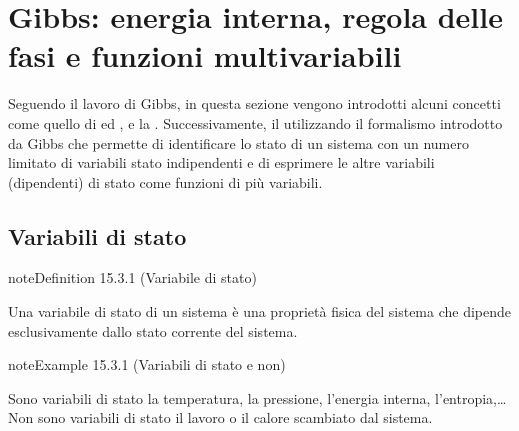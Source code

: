 \documentclass[letterpaper,10pt,italian]{jupyterBook}
\begin{document}
\section{Gibbs: energia interna, regola delle fasi e funzioni multi\sphinxhyphen{}variabili}
\label{\detokenize{ch/thermodynamics/principles-gibbs-phase-rule:gibbs-energia-interna-regola-delle-fasi-e-funzioni-multi-variabili}}\label{\detokenize{ch/thermodynamics/principles-gibbs-phase-rule:physics-hs-thermodynamics-foundation-principles-gibbs-phase-rule}}\label{\detokenize{ch/thermodynamics/principles-gibbs-phase-rule::doc}}
\sphinxAtStartPar
Seguendo il lavoro di Gibbs, in questa sezione vengono introdotti alcuni concetti come quello di {\hyperref[\detokenize{ch/thermodynamics/principles-gibbs-phase-rule:physics-hs-thermodynamics-foundation-principles-gibbs-phase-rule-state-vars}]{}} ed {\hyperref[\detokenize{ch/thermodynamics/principles-gibbs-phase-rule:physics-hs-thermodynamics-foundation-principles-gibbs-phase-rule-internal-energy}]{}}, e la {\hyperref[\detokenize{ch/thermodynamics/principles-gibbs-phase-rule:physics-hs-thermodynamics-foundation-principles-gibbs-phase-rule-gibbs-phase-rule}]{}}. Successivamente, il {\hyperref[\detokenize{ch/thermodynamics/principles-gibbs-phase-rule:physics-hs-thermodynamics-foundation-principles-gibbs-phase-rule-first}]{}} utilizzando il formalismo introdotto da Gibbs che permette di identificare lo stato di un sistema con un numero limitato di variabili stato indipendenti e di esprimere le altre variabili (dipendenti) di stato come funzioni di più variabili.


\subsection{Variabili di stato}
\label{\detokenize{ch/thermodynamics/principles-gibbs-phase-rule:variabili-di-stato}}\label{\detokenize{ch/thermodynamics/principles-gibbs-phase-rule:physics-hs-thermodynamics-foundation-principles-gibbs-phase-rule-state-vars}}\label{ch/thermodynamics/principles-gibbs-phase-rule:definition-0}
\begin{sphinxadmonition}{note}{Definition 15.3.1 (Variabile di stato)}



\sphinxAtStartPar
Una variabile di stato di un sistema è una proprietà fisica del sistema che dipende esclusivamente dallo stato corrente del sistema.
\end{sphinxadmonition}
\label{ch/thermodynamics/principles-gibbs-phase-rule:example-1}
\begin{sphinxadmonition}{note}{Example 15.3.1 (Variabili di stato e non)}



\sphinxAtStartPar
Sono variabili di stato la temperatura, la pressione, l’energia interna, l’entropia,…
Non sono variabili di stato il lavoro o il calore scambiato dal sistema. 
\end{sphinxadmonition}
\end{document}
